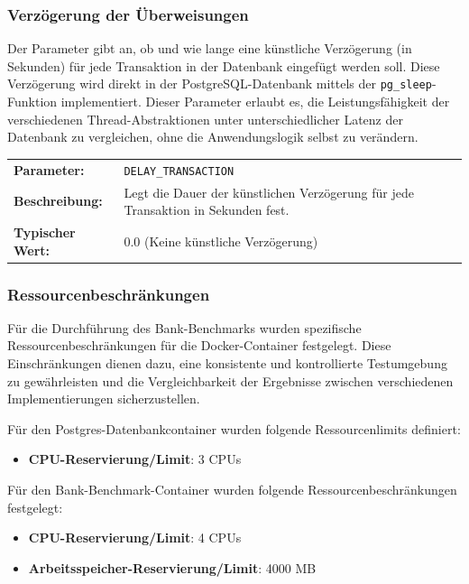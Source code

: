 \documentclass[fontsize=12pt,paper=a4,twoside=semi,parskip=half-,headsepline,headinclude]{scrreprt}
\begin{document}
\subsubsection{Verzögerung der Überweisungen}

Der Parameter gibt an, ob und wie lange eine künstliche Verzögerung (in Sekunden) für jede Transaktion in der Datenbank eingefügt werden soll. Diese Verzögerung wird direkt in der PostgreSQL-Datenbank mittels der \texttt{pg\_sleep}-Funktion implementiert. Dieser Parameter erlaubt es, die Leistungsfähigkeit der verschiedenen Thread-Abstraktionen unter unterschiedlicher Latenz der Datenbank zu vergleichen, ohne die Anwendungslogik selbst zu verändern.

\begin{tabularx}{\textwidth}{@{}lX@{}}
	\textbf{Parameter:} & \texttt{DELAY\_TRANSACTION} \\
	\textbf{Beschreibung:} & Legt die Dauer der künstlichen Verzögerung für jede Transaktion in Sekunden fest. \\
	\textbf{Typischer Wert:} & 0.0 (Keine künstliche Verzögerung)
\end{tabularx}

\subsubsection{Ressourcenbeschränkungen}
\label{subsubsec:bankRes}

Für die Durchführung des Bank-Benchmarks wurden spezifische Ressourcenbe\-schrän\-kun\-gen für die Docker-Container festgelegt. Diese Einschränkungen dienen dazu, eine konsistente und kontrollierte Testumgebung zu gewährleisten und die Vergleichbarkeit der Ergebnisse zwischen verschiedenen Implementierungen sicherzustellen.

Für den Postgres-Datenbankcontainer wurden folgende Ressourcenlimits definiert:
\begin{itemize}
	\item \textbf{CPU-Reservierung/Limit}: 3 CPUs
\end{itemize}

Für den Bank-Benchmark-Container wurden folgende Ressourcenbeschränkungen festgelegt:
\begin{itemize}
	\item \textbf{CPU-Reservierung/Limit}: 4 CPUs
	\item \textbf{Arbeitsspeicher-Reservierung/Limit}: 4000 MB
\end{itemize}
\end{document}
